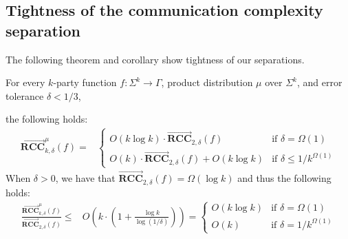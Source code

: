 \documentclass{toc}
\newcommand{\error}{\ensuremath{\delta}}
\newcommand{\bigo}[1]{\ensuremath{{{O} \left( {#1} \right)}}}
\newcommand{\bigomega}[1]{\ensuremath{{\Omega \left( {#1} \right)}}}
\newcommand{\alphabet}{\ensuremath{\Sigma}}
\newcommand{\range}{\ensuremath{\Gamma}}
\newcommand{\rccone}{\ensuremath{\overrightarrow{\mathbf{RCC}}}}
\begin{document}
\subsection{Tightness of the communication complexity separation}

The following theorem and corollary show tightness of our separations.



\begin{theorem}\label{theorem:logk-tight}
For every $k$-party function $f: \alphabet^k\to \range$, product distribution $\mu$ over $\alphabet^k$, and error tolerance $\error <1/3$, 

the following holds:
\begin{align*}
\rccone_{k,\error}^{\mu}(f) =& \begin{cases}
	\bigo{k\log k}	 \cdot  \rccone_{2,\error}(f) & \mbox{if $\error={\bigomega{1}}$}\\
	\bigo{k}	 \cdot  \rccone_{2,\error}(f)+\bigo{k\log k}	& \mbox{if $\error \le 1/k^{\bigomega{1}} $}
\end{cases}  
\end{align*}
When $\delta > 0$, we have that $\rccone_{2,\error}(f) = \Omega(\log k)$ and thus the following holds:
\begin{align*}
\frac{{\rccone_{k,\error}^{\mu}(f)}} {{\rccone_{2,\error}(f)}} \le & 
\bigo{k \cdot \left(1+\frac{\log k}{\log(1/\error)}\right) }
= \begin{cases}
	\bigo{k\log k}	  & \mbox{if $\error={\bigomega{1}}$}\\
	\bigo{k}		& \mbox{if $\error=1/k^{\bigomega{1}}$}
	\end{cases}
\end{align*}


\end{theorem}
\end{document}
